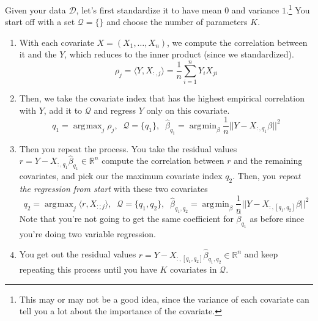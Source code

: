 \documentclass{article}
\DeclareMathOperator*{\argmin}{\arg\!\min}
\DeclareMathOperator*{\argmax}{\arg\!\max}
\begin{document}
    \begin{definition}
      Given your data $\mathcal{D}$, let's first standardize it to have mean $0$ and variance $1$.\footnote{This may or may not be a good idea, since the variance of each covariate can tell you a lot about the importance of the covariate.} You start off with a set $\mathcal{Q} = \{\}$ and choose the number of parameters $K$. 
      \begin{enumerate}
        \item With each covariate $X = (X_1, \ldots, X_n)$, we compute the correlation between it and the $Y$, which reduces to the inner product (since we standardized). 
        \begin{equation}
          \rho_j = \langle Y, X_{:, j} \rangle = \frac{1}{n} \sum_{i=1}^n Y_i X_{ji}
        \end{equation}

        \item Then, we take the covariate index that has the highest empirical correlation with $Y$, add it to $\mathcal{Q}$ and regress $Y$ only on this covariate. 
        \begin{equation}
          q_1 = \argmax_j \rho_j , \;\; \mathcal{Q} = \{q_1\}, \;\; \hat{\beta}_{q_1} = \argmin_{\beta} \frac{1}{n} ||Y - X_{:, q_1} \beta||^2 
        \end{equation}

        \item Then you repeat the process. You take the residual values $r = Y - X_{:, q_1} \hat{\beta}_{q_1} \in \mathbb{R}^n$ compute the correlation between $r$ and the remaining covariates, and pick our the maximum covariate index $q_2$. Then, you \textit{repeat the regression from start} with these two covariates 
        \begin{equation}
          q_2 = \argmax_j \langle r, X_{: ; j} \rangle , \;\; \mathcal{Q} = \{q_1, q_2\}, \;\; \hat{\beta}_{q_1, q_2} = \argmin_{\beta} \frac{1}{n} ||Y - X_{:,[q_1, q_2]} \beta||^2
        \end{equation}
        Note that you're not going to get the same coefficient for $\hat{\beta}_{q_1}$ as before since you're doing two variable regression. 

        \item You get out the residual values $r = Y - X_{:, [q_1, q_2]} \hat{\beta}_{q_1, q_2} \in \mathbb{R}^n$ and keep repeating this process until you have $K$ covariates in $\mathcal{Q}$. 
      \end{enumerate}
    \end{definition}
\end{document}
